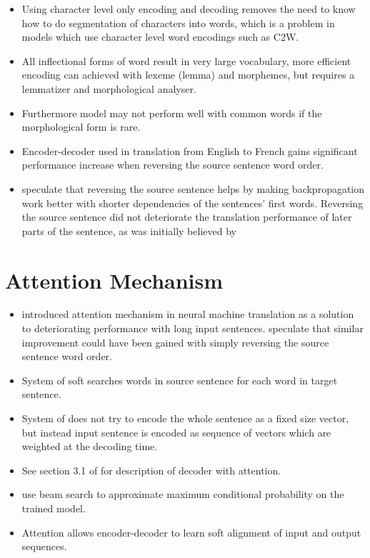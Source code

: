 \documentclass[12pt,a4paper,english
]{tutthesis}
\begin{document}
\begin{itemize}
\item Using character level only encoding and decoding removes the need to know how to do segmentation of characters into words, which is a problem in models which use character level word encodings such as C2W. \cite{Chung2016}
\item All inflectional forms of word result in very large vocabulary, more efficient encoding can achieved with lexeme (lemma) and morphemes, but requires a lemmatizer and morphological analyser. \cite{Chung2016}
\item Furthermore model may not perform well with common words if the morphological form is rare. \cite{Chung2016}
\item Encoder-decoder used in translation from English to French gains significant performance increase when reversing the source sentence word order. \cite{Sutskever2014}
\item \cite{Sutskever2014} speculate that reversing the source sentence helps by making backpropagation work better with shorter dependencies of the sentences' first words. Reversing the source sentence did not deteriorate the translation performance of later parts of the sentence, as was initially believed by \cite{Sutskever2014}
\end{itemize}

\section{Attention Mechanism}
\begin{itemize}
\item \cite{Bahdanau2014} introduced attention mechanism in neural machine translation as a solution to deteriorating performance with long input sentences. \cite{Sutskever2014} speculate that similar improvement could have been gained with simply reversing the source sentence word order.
\item System of \cite{Bahdanau2014} soft searches words in source sentence for each word in target sentence.
\item System of \cite{Bahdanau2014} does not try to encode the whole sentence as a fixed size vector, but instead input sentence is encoded as sequence of vectors which are weighted at the decoding time.
\item See section 3.1 of \cite{Bahdanau2014} for description of decoder with attention.
\item \cite{Bahdanau2014} use beam search to approximate maximum conditional probability on the trained model.
\item Attention allows encoder-decoder to learn soft alignment of input and output sequences. \cite{Liu2016a}
\end{itemize}
\end{document}
